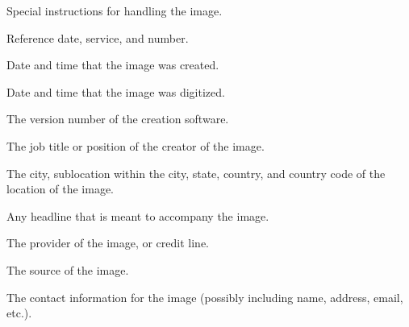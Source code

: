 Special instructions for handling the image.
\apiend

Reference date, service, and number.
\apiend

Date and time that the image was created.
\apiend

Date and time that the image was digitized.
\apiend



The version number of the creation software.
\apiend

The job title or position of the creator of the image.
\apiend

The city, sublocation within the city,
state, country, and country code of the location of the image.
\apiend

Any headline that is meant to accompany the image.
\apiend

The provider of the image, or credit line.
\apiend

The source of the image.
\apiend


The contact information for the image (possibly including name, address,
email, etc.).
\apiend


